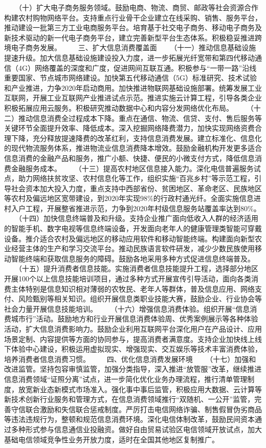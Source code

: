 \documentclass[11pt]{ctexart}
\begin{document}
{{{{　　（十）扩大电子商务服务领域。鼓励电商、物流、商贸、邮政等社会资源合作构建农村购物网络平台。支持重点行业骨干企业建立在线采购、销售、服务平台，推动建设一批第三方工业电商服务平台。培育基于社交电子商务、移动电子商务及新技术驱动的新一代电子商务平台，建立完善新型平台生态体系。积极稳妥推进跨境电子商务发展。
　　三、扩大信息消费覆盖面
　　（十一）推动信息基础设施提速升级。加大信息基础设施建设投入力度，进一步拓展光纤宽带和第四代移动通信（4G）网络覆盖的深度和广度，促进网间互联互通。积极参与“一带一路”沿线重要国家、节点城市网络建设。加快第五代移动通信（5G）标准研究、技术试验和产业推进，力争2020年启动商用。加快推进物联网基础设施部署。统筹发展工业互联网，开展工业互联网产业推进试点示范。推进实施云计算工程，引导各类企业积极拓展应用云服务。积极研究推动数据中心和内容分发网络优化布局。
　　（十二）推动信息消费全过程成本下降。重点在通信、物流、信贷、支付、售后服务等关键环节全面提升效率、降低成本。深入挖掘网络降费潜力，加快实现网络资费合理下降，充分释放提速降费的改革红利，支持信息消费发展。建立标准化、信息化的现代物流服务体系，推进物流业信息消费降本增效。鼓励金融机构开发更多适合信息消费的金融产品和服务，推广小额、快捷、便民的小微支付方式，降低信息消费金融服务成本。
　　（十三）提高农村地区信息接入能力。深化电信普遍服务试点，助力网络扶贫攻坚、农村信息化等工作，组织实施“百兆乡村”等示范工程，引导社会资本加大投入力度，重点支持中西部省份、贫困地区、革命老区、民族地区等农村及偏远地区宽带建设，到2020年实现98\%的行政村通光纤。全面实施信息进村入户工程，开展整省推进示范，力争到2020年村级信息服务站覆盖率达到80\%。
　　（十四）加快信息终端普及和升级。支持企业推广面向低收入人群的经济适用的智能手机、数字电视等信息终端设备，开发面向老年人的健康管理类智能可穿戴设备。推介适合农村及偏远地区的移动应用软件和移动智能终端。构建面向新型农业经营主体的生产和学习交流平台。推动民族语言软件研发，减少少数民族使用移动智能终端和获取信息服务的障碍。鼓励各地采用多种方式促进信息终端普及。
　　（十五）提升消费者信息技能。实施消费者信息技能提升工程，选择部分地区开展100个以上信息技能培训项目，通过多种方式开展宣传引导活动，面向各类消费主体特别是信息知识相对薄弱的农牧民、老年人等群体，普及信息应用、网络支付、风险甄别等相关知识。组织开展信息类职业技能大赛，鼓励企业、行业协会等社会力量开展信息技能培训。
　　（十六）增强信息消费体验。组织开展“信息消费城市行”活动。鼓励地方和行业开展信息消费体验周、优秀案例展示等各种体验活动，扩大信息消费影响力。鼓励企业利用互联网平台深化用户在产品设计、应用场景定制、内容提供等方面的协同参与，提高消费者满意度。支持企业加快线上线下体验中心建设，积极运用虚拟现实、增强现实、交互娱乐等技术丰富消费体验，培养消费者信息消费习惯。
　　四、优化信息消费发展环境
　　（十七）加强和改进监管。坚持包容审慎监管，加强分类指导，深入推进“放管服”改革，继续推进信息消费领域“证照分离”试点，进一步简化优化业务办理流程，推行清单管理制度，放宽新业态新模式市场准入。强化事中事后监管，积极应用大数据、云计算等新技术创新行业服务和管理方式，在信息消费领域推行“双随机、一公开”监管，完善守信联合激励和失信联合惩戒制度。严厉打击电信网络诈骗、制售假冒伪劣商品等违法违规行为，整顿和规范信息消费环境。深化电信体制改革，鼓励民间资本通过多种形式参与信息通信业投融资。做好自由贸易试验区电信领域开放试点，加大基础电信领域竞争性业务开放力度，适时在全国其他地区复制推广。
}}}}
\end{document}
